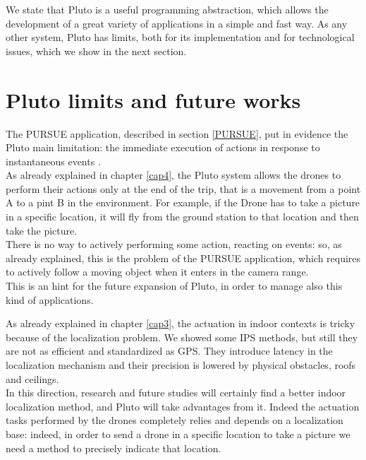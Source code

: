 We state that Pluto is a useful programming abstraction, which allows the development of a great variety of applications in a simple and fast way.
As any other system, Pluto has limits, both for its implementation and for technological issues, which we show in the next section.

\newpage

\section{Pluto limits and future works}

The PURSUE application, described in section \ref{PURSUE}, put in evidence the Pluto main limitation: the immediate execution of actions in response to instantaneous events .
\\

As already explained in chapter \ref{cap4}, the Pluto system allows the drones to perform their actions only at the end of the trip, that is a movement from a point A to a pint B in the environment.
For example, if the Drone has to take a picture in a specific location, it will fly from the ground station to that location and then take the picture.
\\

There is no way to actively performing some action, reacting on events:
so, as already explained, this is the problem of the PURSUE application, which requires to actively follow a moving object when it enters in the camera range.
\\

This is an hint for the future expansion of Pluto, in order to manage also this kind of applications.

As already explained in chapter \ref{cap3}, the actuation in indoor contexts is tricky because of the localization problem.
We showed some IPS methods, but still they are not as efficient and standardized as GPS.
They introduce latency in the localization mechanism and their precision is lowered by physical obstacles, roofs and ceilings.
\\

In this direction, research and future studies will certainly find a better indoor localization method, and Pluto will take advantages from it.
Indeed the actuation tasks performed by the drones completely relies and depends on a localization base: indeed, in order to send a drone in a specific location to take a picture we need a method to precisely indicate that location.
\\

